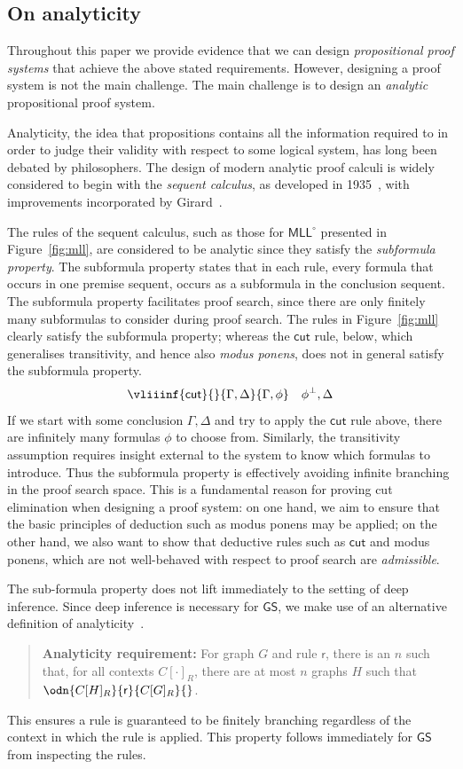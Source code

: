 \documentclass{lmcs} %
\def\GS{\mathsf{GS}}
\newcommand{\coons}[2]{[#1]_{#2}}														%
\newcommand{\coonso}[1]{[\cdot]_{#1}}
\def\rr{\mathsf{r}}
\def\cneg#1{{#1^\bot}}
\def\cutr{\mathsf {cut}}
\def\MLLm{\mathsf{MLL^\circ}}
\def\gC{C}
\def\gG{G}
\def\gH{H}
\theoremstyle{plain}
\begin{document}
\subsection*{On analyticity}
Throughout this paper we provide evidence that we can design \textit{propositional proof systems} that achieve the above stated requirements.
However, 
designing a proof system is not the main challenge.
The main challenge is to design an \textit{analytic} propositional proof system.

Analyticity, the idea that propositions contains all the information required to in order to judge their validity with respect to some logical system, has long been debated by philosophers.
The design of modern analytic proof calculi is widely considered to begin with the \textit{sequent calculus}, as developed in 1935~\cite{gentzen:35:I,gentzen:35:II},
with improvements incorporated by Girard~\cite{girard:87}. 


The rules of the sequent calculus, such as those for $\MLLm$ 
presented in Figure~\ref{fig:mll}, are considered to be analytic since they satisfy the \textit{subformula property}. 
The subformula property states that 
in each rule, every formula that occurs in one premise sequent, occurs as a subformula in the conclusion sequent.
The subformula property facilitates proof search, since there are only finitely many subformulas to consider during proof search.
The rules in Figure~\ref{fig:mll} clearly satisfy the subformula property; whereas the $\cutr$ rule, below, which generalises transitivity, and hence also \textit{modus ponens}, does not in general satisfy the subformula property.
\[
\vliiinf{\cutr}{}{\Gamma, \Delta}{\Gamma, \phi}\quad{\cneg{\phi}, \Delta}
\]
If we start with some conclusion $\Gamma, \Delta$ and try to apply the $\cutr$ rule above, there are infinitely many formulas $\phi$ to choose from.
Similarly, the transitivity assumption requires insight external to the system to know which formulas to introduce.
Thus the subformula property is effectively avoiding infinite branching in the proof search space.
This is a fundamental reason for proving cut elimination when designing a proof system: on one hand, we aim to ensure that the basic principles of deduction such as modus ponens may be applied; on the other hand, we also want to show that deductive rules such as $\cutr$ and modus ponens, which are not well-behaved with respect to proof search are \textit{admissible}.

The sub-formula property does not lift immediately to the setting of deep inference.
Since deep inference is necessary for $\GS$, we make use of an alternative definition of analyticity~\cite{Bruscoli2009,Bruscoli2016}.
\begin{quote}
	\textbf{Analyticity requirement:} For graph $\gG$ and rule $\rr$, there is an $n$ such that, for all contexts $\gC\coonso{R}$, there are at most $n$ graphs $\gH$ such that $\odn{\gC\coons{\gH}{R}}{\rr}{\gC\coons{\gG}{R}}{}$.
\end{quote}
This ensures a rule is guaranteed to be finitely branching regardless of the context in which the rule is applied.
This property follows immediately for $\GS$ from inspecting the rules.
\end{document}
